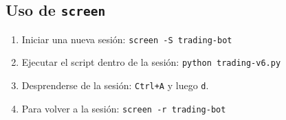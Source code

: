 \documentclass[12pt, a4paper]{article}
\begin{document}
\subsection{Uso de \texttt{screen}}
\begin{enumerate}
    \item Iniciar una nueva sesión: \texttt{screen -S trading-bot}
    \item Ejecutar el script dentro de la sesión: \texttt{python trading-v6.py}
    \item Desprenderse de la sesión: \texttt{Ctrl+A} y luego \texttt{d}.
    \item Para volver a la sesión: \texttt{screen -r trading-bot}
\end{enumerate}
\end{document}
